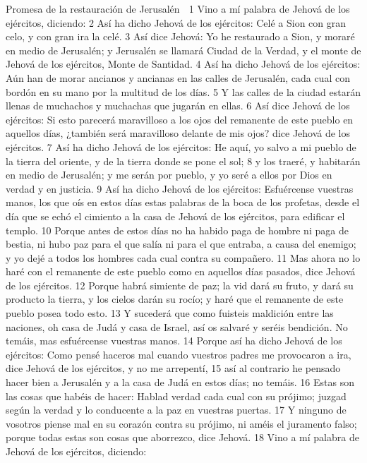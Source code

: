 Promesa de la restauración de Jerusalén

1 Vino a mí palabra de Jehová de los ejércitos, diciendo:
2 Así ha dicho Jehová de los ejércitos: Celé a Sion con gran celo, y con gran ira la celé.
3 Así dice Jehová: Yo he restaurado a Sion, y moraré en medio de Jerusalén; y Jerusalén se llamará Ciudad de la Verdad, y el monte de Jehová de los ejércitos, Monte de Santidad.
4 Así ha dicho Jehová de los ejércitos: Aún han de morar ancianos y ancianas en las calles de Jerusalén, cada cual con bordón en su mano por la multitud de los días.
5 Y las calles de la ciudad estarán llenas de muchachos y muchachas que jugarán en ellas.
6 Así dice Jehová de los ejércitos: Si esto parecerá maravilloso a los ojos del remanente de este pueblo en aquellos días, ¿también será maravilloso delante de mis ojos? dice Jehová de los ejércitos.
7 Así ha dicho Jehová de los ejércitos: He aquí, yo salvo a mi pueblo de la tierra del oriente, y de la tierra donde se pone el sol;
8 y los traeré, y habitarán en medio de Jerusalén; y me serán por pueblo, y yo seré a ellos por Dios en verdad y en justicia.
9 Así ha dicho Jehová de los ejércitos: Esfuércense vuestras manos, los que oís en estos días estas palabras de la boca de los profetas, desde el día que se echó el cimiento a la casa de Jehová de los ejércitos, para edificar el templo.
10 Porque antes de estos días no ha habido paga de hombre ni paga de bestia, ni hubo paz para el que salía ni para el que entraba, a causa del enemigo; y yo dejé a todos los hombres cada cual contra su compañero.
11 Mas ahora no lo haré con el remanente de este pueblo como en aquellos días pasados, dice Jehová de los ejércitos.
12 Porque habrá simiente de paz; la vid dará su fruto, y dará su producto la tierra, y los cielos darán su rocío; y haré que el remanente de este pueblo posea todo esto.
13 Y sucederá que como fuisteis maldición entre las naciones, oh casa de Judá y casa de Israel, así os salvaré y seréis bendición. No temáis, mas esfuércense vuestras manos.
14 Porque así ha dicho Jehová de los ejércitos: Como pensé haceros mal cuando vuestros padres me provocaron a ira, dice Jehová de los ejércitos, y no me arrepentí,
15 así al contrario he pensado hacer bien a Jerusalén y a la casa de Judá en estos días; no temáis.
16 Estas son las cosas que habéis de hacer: Hablad verdad cada cual con su prójimo; juzgad según la verdad y lo conducente a la paz en vuestras puertas.
17 Y ninguno de vosotros piense mal en su corazón contra su prójimo, ni améis el juramento falso; porque todas estas son cosas que aborrezco, dice Jehová.
18 Vino a mí palabra de Jehová de los ejércitos, diciendo:
